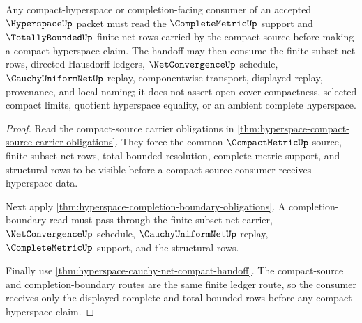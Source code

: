 \begin{theorem}
\label{thm:hyperspace-root-complete-totallybounded-handoff}
Any compact-hyperspace or completion-facing consumer of an accepted $\HyperspaceUp$ packet must read the $\CompleteMetricUp$ support and $\TotallyBoundedUp$ finite-net rows carried by the compact source before making a compact-hyperspace claim. The handoff may then consume the finite subset-net rows, directed Hausdorff ledgers, $\NetConvergenceUp$ schedule, $\CauchyUniformNetUp$ replay, componentwise transport, displayed replay, provenance, and local naming; it does not assert open-cover compactness, selected compact limits, quotient hyperspace equality, or an ambient complete hyperspace.
\end{theorem}
\begin{proof}
Read the compact-source carrier obligations in \autoref{thm:hyperspace-compact-source-carrier-obligations}. They force the common $\CompactMetricUp$ source, finite subset-net rows, total-bounded resolution, complete-metric support, and structural rows to be visible before a compact-source consumer receives hyperspace data.

Next apply \autoref{thm:hyperspace-completion-boundary-obligations}. A completion-boundary read must pass through the finite subset-net carrier, $\NetConvergenceUp$ schedule, $\CauchyUniformNetUp$ replay, $\CompleteMetricUp$ support, and the structural rows.

Finally use \autoref{thm:hyperspace-cauchy-net-compact-handoff}. The compact-source and completion-boundary routes are the same finite ledger route, so the consumer receives only the displayed complete and total-bounded rows before any compact-hyperspace claim.
\end{proof}

